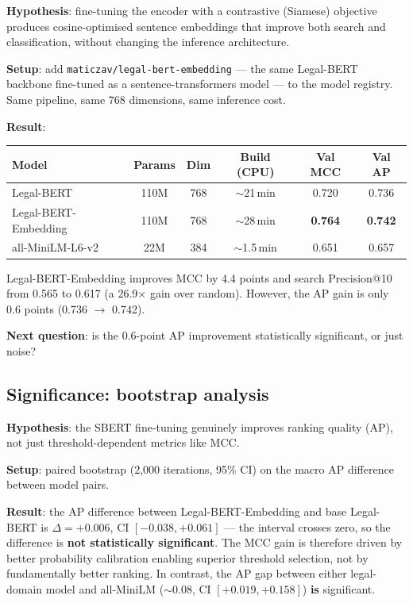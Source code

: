 \documentclass[11pt,a4paper]{article}
\begin{document}
\textbf{Hypothesis}: fine-tuning the encoder with a contrastive (Siamese)
objective produces cosine-optimised sentence embeddings that improve
both search and classification, without changing the inference
architecture.

\textbf{Setup}: add \texttt{maticzav/legal-bert-embedding} --- the same
Legal-BERT backbone fine-tuned as a sentence-transformers model --- to the
model registry.  Same pipeline, same 768 dimensions, same inference cost.

\textbf{Result}:

\begin{center}
\begin{tabular}{l c c c c c}
\hline
Model & Params & Dim & Build (CPU) & Val MCC & Val AP \\
\hline
Legal-BERT               & 110M & 768 & $\sim$21\,min & 0.720 & 0.736 \\
Legal-BERT-Embedding     & 110M & 768 & $\sim$28\,min & \textbf{0.764} & \textbf{0.742} \\
all-MiniLM-L6-v2         &  22M & 384 & $\sim$1.5\,min & 0.651 & 0.657 \\
\hline
\end{tabular}
\end{center}

Legal-BERT-Embedding improves MCC by 4.4 points and search Precision@10
from 0.565 to 0.617 (a 26.9$\times$ gain over random).  However, the AP
gain is only 0.6 points (0.736 $\rightarrow$ 0.742).

\textbf{Next question}: is the 0.6-point AP improvement statistically
significant, or just noise?

\subsection{Significance: bootstrap analysis}

\textbf{Hypothesis}: the SBERT fine-tuning genuinely improves ranking
quality (AP), not just threshold-dependent metrics like MCC.

\textbf{Setup}: paired bootstrap (2,000 iterations, 95\% CI) on the macro
AP difference between model pairs.

\textbf{Result}: the AP difference between Legal-BERT-Embedding and base
Legal-BERT is $\Delta = +0.006$, CI $[-0.038, +0.061]$ --- the interval
crosses zero, so the difference is \textbf{not statistically significant}.
The MCC gain is therefore driven by better probability calibration
enabling superior threshold selection, not by fundamentally better
ranking.  In contrast, the AP gap between either legal-domain model and
all-MiniLM ($\sim$0.08, CI $[+0.019, +0.158]$) \textbf{is} significant.
\end{document}
